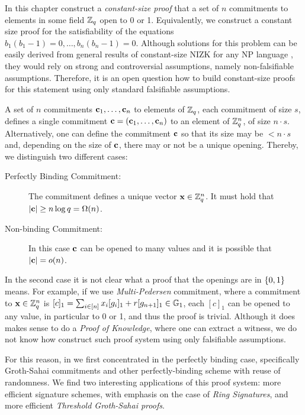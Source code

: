 In this chapter construct a \emph{constant-size proof} that a set of $n$ commitments to elements in some field $\mathbb{Z}_q$ open to 0 or 1. Equivalently, we construct a constant size proof for the satisfiability of the equations $b_1(b_1-1)=0,\ldots,b_n(b_n-1)=0$.
Although solutions for this problem can be easily derived from general results of constant-size NIZK for any NP language \cite{EC:GGPR13,AC:DFGK14,EC:Groth16}, they would rely on strong and controversial assumptions, namely non-falsifiable assumptions. Therefore, it is an open question how to build constant-size proofs for this statement using only standard falsifiable assumptions. 

A set of $n$ commitments $\mathbf{c}_1,\ldots,\mathbf{c}_n$ to elements of $\mathbb{Z}_q$, each commitment of size $s$, defines a single commitment $\mathbf{c}=(\mathbf{c}_1,\ldots,\mathbf{c}_n)$ to an element of $\mathbb{Z}_q^n$, of size $n\cdot s$. Alternatively, one can define the commitment $\mathbf{c}$ so that its size may be $<n\cdot s$ and, depending on the size of $\mathbf{c}$, there may or not be a unique opening. Thereby, we distinguish two different cases:

\begin{description}
\item[Perfectly Binding Commitment:] The commitment defines a unique vector $\mathbf{x}\in\mathbb{Z}_q^n$. It must hold that $|\mathbf{c}|\geq n\log q = \Omega(n)$.
\item[Non-binding Commitment:] In this case $\mathbf{c}$ can be opened to many values and it is possible that $|\mathbf{c}|= o(n)$.
\end{description}

In the second case it is not clear what a proof that the openings are in $\{0,1\}$ means. For example, if we use \emph{Multi-Pedersen} commitment, where a commitment to $\mathbf{x}\in\mathbb{Z}_q^n$ is $[c]_1=\sum_{i\in[n]}x_i[g_i]_1+r[g_{n+1}]_1\in\mathbb{G}_1$, each $[c]_1$ can be opened to any value, in particular to 0 or 1, and thus the proof is trivial. Although it does makes sense to do a \emph{Proof of Knowledge}, where one can extract a witness, we do not know how construct such proof system using only falsifiable assumptions.

For this reason, in \cite{AC:GonHevRaf15} we first concentrated in the perfectly binding case, specifically Groth-Sahai commitments and other perfectly-binding scheme with reuse of randomness. We find two interesting applications of this proof system: more efficient signature schemes, with emphasis on the case of \emph{Ring Signatures}, and more efficient \emph{Threshold Groth-Sahai proofs}.
 
